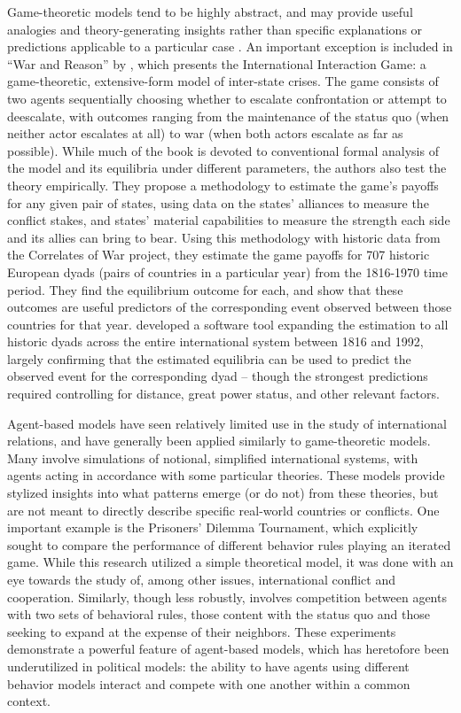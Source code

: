 Game-theoretic models tend to be highly abstract, and may provide useful analogies and theory-generating insights rather than specific explanations or predictions applicable to a particular case \citep{snidal_1985}. An important exception is included in ``War and Reason'' by \citet{bdm_1992}, which presents the International Interaction Game: a game-theoretic, extensive-form model of inter-state crises. The game consists of two agents sequentially choosing whether to escalate confrontation or attempt to deescalate, with outcomes ranging from the maintenance of the status quo (when neither actor escalates at all) to war (when both actors escalate as far as possible). While much of the book is devoted to conventional formal analysis of the model and its equilibria under different parameters, the authors also test the theory empirically. They propose a methodology to estimate the game's payoffs for any given pair of states, using data on the states' alliances to measure the conflict stakes,  and states' material capabilities to measure the strength each side and its allies can bring to bear. Using this methodology with historic data from the Correlates of War project, they estimate the game payoffs for 707 historic European dyads (pairs of countries in a particular year) from the 1816-1970 time period. They find the equilibrium outcome for each, and show that these outcomes are useful predictors of the corresponding event observed between those countries for that year. \citet{bennett_2000b} developed a software tool expanding the estimation to all historic dyads across the entire international system between 1816 and 1992, largely confirming that the estimated equilibria can be used to predict the observed event for the corresponding dyad -- though the strongest predictions required controlling for distance, great power status, and other relevant factors.

Agent-based models have seen relatively limited use in the study of international relations, and have generally been applied similarly to game-theoretic models. Many \citep[e.g.][]{cederman_1997,axelrod_1997,min_2002} involve simulations of notional, simplified international systems, with agents acting in accordance with some particular theories. These models provide stylized insights into what patterns emerge (or do not) from these theories, but are not meant to directly describe specific real-world countries or conflicts. One important example is the \citet{axelrod_1980} Prisoners' Dilemma Tournament, which explicitly sought to compare the performance of different behavior rules playing an iterated game. While this research utilized a simple theoretical model, it was done with an eye towards the study of, among other issues, international conflict and cooperation. Similarly, though less robustly, \citet{cederman_1997} involves competition between agents with two sets of behavioral rules, those content with the status quo and those seeking to expand at the expense of their neighbors. These experiments demonstrate a powerful feature of agent-based models, which has heretofore been underutilized in political models: the ability to have agents using different behavior models interact and compete with one another within a common context.

